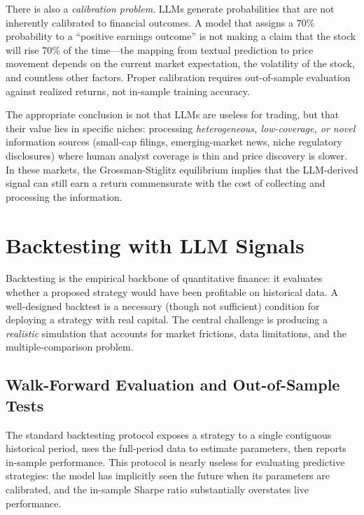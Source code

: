 There is also a \emph{calibration problem}. LLMs generate probabilities that are not
inherently calibrated to financial outcomes. A model that assigns a 70\% probability to
a ``positive earnings outcome'' is not making a claim that the stock will rise 70\% of
the time---the mapping from textual prediction to price movement depends on the current
market expectation, the volatility of the stock, and countless other factors. Proper
calibration requires out-of-sample evaluation against realized returns, not in-sample
training accuracy.

The appropriate conclusion is not that LLMs are useless for trading, but that their
value lies in specific niches: processing \emph{heterogeneous, low-coverage, or novel}
information sources (small-cap filings, emerging-market news, niche regulatory
disclosures) where human analyst coverage is thin and price discovery is slower. In
these markets, the Grossman-Stiglitz equilibrium implies that the LLM-derived signal
can still earn a return commensurate with the cost of collecting and processing the
information.

\section{Backtesting with LLM Signals}
\label{sec:ch10-backtesting}

Backtesting is the empirical backbone of quantitative finance: it evaluates whether a
proposed strategy would have been profitable on historical data. A well-designed backtest
is a necessary (though not sufficient) condition for deploying a strategy with real
capital. The central challenge is producing a \emph{realistic} simulation that accounts
for market frictions, data limitations, and the multiple-comparison problem.

\subsection{Walk-Forward Evaluation and Out-of-Sample Tests}
\label{sec:ch10-walk-forward}

The standard backtesting protocol exposes a strategy to a single contiguous historical
period, uses the full-period data to estimate parameters, then reports in-sample
performance. This protocol is nearly useless for evaluating predictive strategies: the
model has implicitly seen the future when its parameters are calibrated, and the
in-sample Sharpe ratio substantially overstates live performance.

